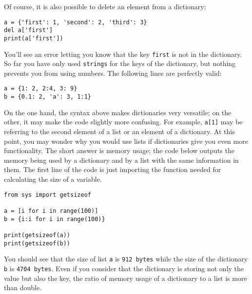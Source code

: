
Of course, it is also possible to delete an element from a dictionary:

\begin{verbatim}
a = {'first': 1, 'second': 2, 'third': 3}
del a['first']
print(a['first'])
\end{verbatim}

You'll see an error letting you know that the key \texttt{first} is not in the dictionary. So far you have only used \texttt{strings} for the keys of the dictionary, but nothing prevents you from using numbers. The following lines are perfectly valid:

\begin{verbatim}
a = {1: 2, 2:4, 3: 9}
b = {0.1: 2, 'a': 3, 1:1}
\end{verbatim}

On the one hand, the syntax above makes dictionaries very versatile; on the other, it may make the code slightly more confusing. For example, \texttt{a[1]} may be referring to the second element of a list or an element of a dictionary. At this point, you may wonder why you would use lists if dictionaries give you even more functionality. The short answer is memory usage; the code below outputs the memory being used by a dictionary and by a list with the same information in them. The first line of the code is just importing the function needed for calculating the size of a variable.

\begin{verbatim}
from sys import getsizeof

a = [i for i in range(100)]
b = {i:i for i in range(100)}

print(getsizeof(a))
print(getsizeof(b))
\end{verbatim}

You should see that the size of list \texttt{a} is \texttt{912 bytes} while the size of the dictionary \texttt{b} is \texttt{4704 bytes}. Even if you consider that the dictionary is storing not only the value but also the key, the ratio of memory usage of a dictionary to a list is more than double.

